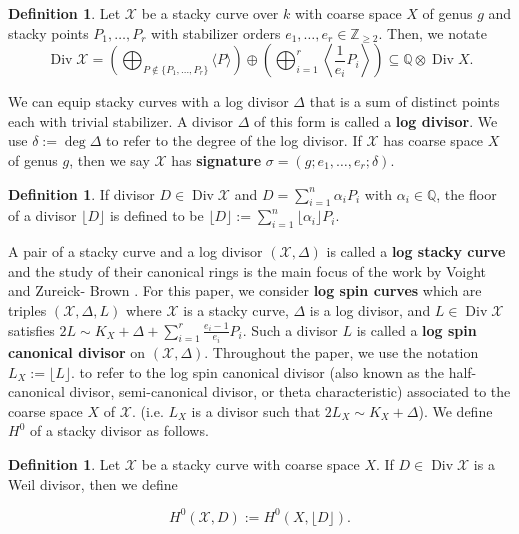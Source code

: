\documentclass{amsart}
\theoremstyle{plain}
\theoremstyle{definition}
\newtheorem{defn}[thm]{Definition}
\theoremstyle{remark}
\numberwithin{equation}{section}
\newcommand\BQ{{\mathbb Q}}
\newcommand\BZ{{\mathbb Z}}
\DeclareMathOperator\di{Div}
\newcommand\sx{\mathscr X}
\newcommand{\halfcan}{L}
\begin{document}
\begin{defn}
\label{defn:div-ex}
Let $\sx$ be a stacky curve over $k$ with coarse space $X$ of genus $g$ and stacky points $P_1, \ldots,
P_r$ with stabilizer orders $e_1, \ldots, e_r \in \BZ_{\geq 2}$.
Then, we notate
\[
	\di \sx = \left(\bigoplus_{P\notin \{P_1, \ldots, P_r\}} \langle 
	P \rangle \right) \oplus \left(\bigoplus_{i = 1}^r \left \langle 
	\frac{1}{e_i}P_i \right \rangle \right) \subseteq \BQ \otimes \di X.
\]
\end{defn}

We can equip stacky curves with a log divisor $\Delta$ that is a 
sum of distinct points each with trivial stabilizer. 
A divisor
$\Delta$ of this form is called a \textbf{log divisor}. We use
$\delta := \deg \Delta$ to refer to the degree of the log divisor.
If $\sx$ has coarse space $X$ of genus $g$, then we say $\sx$ has
\textbf{signature} $\sigma = (g; e_1, \ldots, e_r; \delta)$.

\begin{defn}
\label{defn:divisor-floor}
If divisor $D \in \di \sx$ and $D = \sum_{i = 1}^{n} \alpha_i P_i$
with $\alpha_i \in \BQ$, the floor of a divisor $\lfloor D
\rfloor$ is defined to be $\lfloor D \rfloor := \sum_{i = 1}^{n}
\lfloor \alpha_i \rfloor P_i$.
\end{defn}

A pair of a stacky curve and a log divisor $(\sx, \Delta)$ is
called a \textbf{log stacky curve} and the study of their
canonical rings is the main focus of the work by Voight and Zureick-
Brown \cite{vzb:stacky}. For this paper, we consider \textbf{log
spin curves} which are triples $(\sx, \Delta, \halfcan)$ where $\sx$
is a stacky curve, $\Delta$ is a log divisor, and $\halfcan \in \di
\sx$ satisfies $2 \halfcan \sim K_X + \Delta + \sum_{i = 1}^{r}
\frac{e_i - 1}{e_i} P_i$. Such a divisor $\halfcan$ is called a
\textbf{log spin canonical divisor} on $(\sx, \Delta)$. Throughout the paper, we use
the notation $\halfcan_X := \lfloor L \rfloor.$ to refer to the log spin
canonical divisor (also known as the half-canonical divisor, 
semi-canonical divisor, or theta characteristic) associated to the
coarse space $X$ of $\sx.$  (i.e. $\halfcan_X$ is a divisor such
that $2\halfcan_X \sim K_X + \Delta$). 
We define $H^0$ of a stacky divisor as follows.

\begin{defn}
\label{defn:h0-stacky}
Let $\sx$ be a stacky curve with coarse space $X$.
If $D \in \di \sx$ is a Weil divisor, then we define

\[
	H^0(\sx, D) := H^0(X, \lfloor D \rfloor).
\]
\end{defn}
\end{document}
